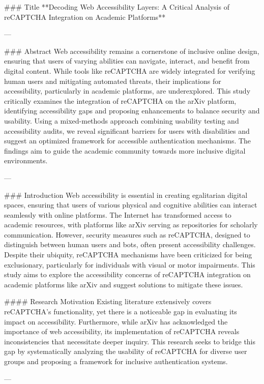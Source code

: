 ### Title  
**Decoding Web Accessibility Layers: A Critical Analysis of reCAPTCHA Integration on Academic Platforms**

---

### Abstract  
Web accessibility remains a cornerstone of inclusive online design, ensuring that users of varying abilities can navigate, interact, and benefit from digital content. While tools like reCAPTCHA are widely integrated for verifying human users and mitigating automated threats, their implications for accessibility, particularly in academic platforms, are underexplored. This study critically examines the integration of reCAPTCHA on the arXiv platform, identifying accessibility gaps and proposing enhancements to balance security and usability. Using a mixed-methods approach combining usability testing and accessibility audits, we reveal significant barriers for users with disabilities and suggest an optimized framework for accessible authentication mechanisms. The findings aim to guide the academic community towards more inclusive digital environments.

---

### Introduction  
Web accessibility is essential in creating egalitarian digital spaces, ensuring that users of various physical and cognitive abilities can interact seamlessly with online platforms. The Internet has transformed access to academic resources, with platforms like arXiv serving as repositories for scholarly communication. However, security measures such as reCAPTCHA, designed to distinguish between human users and bots, often present accessibility challenges. Despite their ubiquity, reCAPTCHA mechanisms have been criticized for being exclusionary, particularly for individuals with visual or motor impairments. This study aims to explore the accessibility concerns of reCAPTCHA integration on academic platforms like arXiv and suggest solutions to mitigate these issues.  

#### Research Motivation  
Existing literature extensively covers reCAPTCHA's functionality, yet there is a noticeable gap in evaluating its impact on accessibility. Furthermore, while arXiv has acknowledged the importance of web accessibility, its implementation of reCAPTCHA reveals inconsistencies that necessitate deeper inquiry. This research seeks to bridge this gap by systematically analyzing the usability of reCAPTCHA for diverse user groups and proposing a framework for inclusive authentication systems.

---

